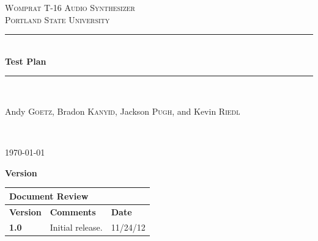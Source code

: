\documentclass{article}
\newcommand{\HRule}{\rule{\linewidth}{0.5mm}}
\begin{document}
\newenvironment{frcseries}{\fontfamily{frc}\selectfont}{}
\newcommand{\textfrc}[1]{{\frcseries#1}}
\newcommand{\mathfrc}[1]{\text{\textfrc{#1}}}

\begin{titlepage}
 
\begin{center}
 
 
\textsc{\LARGE Womprat T-16 Audio Synthesizer}\\[1.5cm]
 
\textsc{\Large Portland State University}\\[0.5cm]
 
 
\HRule \\[0.4cm]
{ \huge \bfseries Test Plan}\\[0.4cm]
 
\HRule \\[1.5cm]
 
\begin{minipage}{0.4\textwidth}
\begin{center} \large
Andy \textsc{Goetz}, Bradon \textsc{Kanyid}, Jackson \textsc{Pugh}, and Kevin \textsc{Riedl}\\
\end{center}
\end{minipage}

 

 
 
\end{center}
\vfill
{ \textit{} }\\[4.0cm]
\begin{center}
{\large \today}

\end{center} 
\end{titlepage}

\newpage

\textbf{\large Version}
\vspace{.1in}

\begin{tabular}{|p{1in}|p{4in}|p{1in}|}
\hline
\multicolumn{3}{|l|}{\textbf{Document Review}} \\ 
\hline
\textbf{Version}& \textbf{Comments} & \textbf{Date} \\ 
\hline
\textbf{1.0} & Initial release. & 11/24/12 \\
\hline
\end{tabular}
\end{document}
